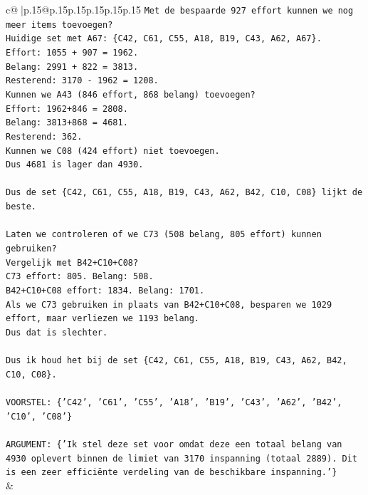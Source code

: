\documentclass{article}
\begin{document}
{\begin{supertabular}{c@{$\;$}|p{.15\linewidth}@{}p{.15\linewidth}p{.15\linewidth}p{.15\linewidth}p{.15\linewidth}p{.15\linewidth}}
{{{\texttt{Met de bespaarde 927 effort kunnen we nog meer items toevoegen?} \\
\texttt{Huidige set met A67: \{C42, C61, C55, A18, B19, C43, A62, A67\}.} \\
\texttt{Effort: 1055 + 907 = 1962.} \\
\texttt{Belang: 2991 + 822 = 3813.} \\
\texttt{Resterend: 3170 {-} 1962 = 1208.} \\
\texttt{Kunnen we A43 (846 effort, 868 belang) toevoegen?} \\
\texttt{Effort: 1962+846 = 2808.} \\
\texttt{Belang: 3813+868 = 4681.} \\
\texttt{Resterend: 362.} \\
\texttt{Kunnen we C08 (424 effort) niet toevoegen.} \\
\texttt{Dus 4681 is lager dan 4930.} \\
\\ 
\texttt{Dus de set \{C42, C61, C55, A18, B19, C43, A62, B42, C10, C08\} lijkt de beste.} \\
\\ 
\texttt{Laten we controleren of we C73 (508 belang, 805 effort) kunnen gebruiken?} \\
\texttt{Vergelijk met B42+C10+C08?} \\
\texttt{C73 effort: 805. Belang: 508.} \\
\texttt{B42+C10+C08 effort: 1834. Belang: 1701.} \\
\texttt{Als we C73 gebruiken in plaats van B42+C10+C08, besparen we 1029 effort, maar verliezen we 1193 belang.} \\
\texttt{Dus dat is slechter.} \\
\\ 
\texttt{Dus ik houd het bij de set \{C42, C61, C55, A18, B19, C43, A62, B42, C10, C08\}.} \\
\\ 
\texttt{VOORSTEL: \{'C42', 'C61', 'C55', 'A18', 'B19', 'C43', 'A62', 'B42', 'C10', 'C08'\}} \\
\\ 
\texttt{ARGUMENT: \{'Ik stel deze set voor omdat deze een totaal belang van 4930 oplevert binnen de limiet van 3170 inspanning (totaal 2889). Dit is een zeer efficiënte verdeling van de beschikbare inspanning.'\}} \\
            }
        }
    }
    & \\ \\


\end{supertabular}}
\end{document}
